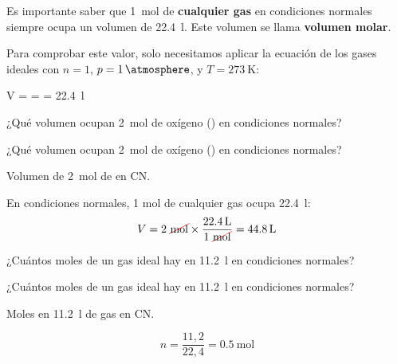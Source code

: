 Es importante saber que \qty{1}{\mol} de \textbf{cualquier gas} en condiciones normales siempre ocupa un volumen de \qty{22.4}{\litre}. Este volumen se llama \textbf{volumen molar}.

Para comprobar este valor, solo necesitamos aplicar la ecuación de los gases ideales con \( n=1 \), \( p = \qty{1}{\atmosphere} \), y \( T = \qty{273}{\kelvin} \):
\begin{centeredequation}
    V =  =  = \qty{22.4}{\litre}
\end{centeredequation}
\begin{exercise}
    ¿Qué volumen ocupan \qty{2}{\mole} de oxígeno () en condiciones normales?
    \begin{solu}
        ¿Qué volumen ocupan \qty{2}{\mole} de oxígeno () en condiciones normales?

        Volumen de \qty{2}{\mole} de  en CN.

        En condiciones normales, 1 mol de cualquier gas ocupa \qty{22.4}{\litre}:
        \begin{equation*}
            V = 2\ \cancelred{\unit{\mole}} \times \dfrac{\qty{22.4}{\litre}}{1\ \cancelred{\unit{\mole}}} = \qty{44.8}{\litre}
        \end{equation*}
    \end{solu}
\end{exercise}
\begin{exercise}
    ¿Cuántos moles de un gas ideal hay en \qty{11.2}{\litre} en condiciones normales?
    \begin{solu}
        ¿Cuántos moles de un gas ideal hay en \qty{11.2}{\litre} en condiciones normales?

        Moles en \qty{11.2}{\litre} de gas en CN.

        \begin{equation*}
            n = \dfrac{11{,}2}{22{,}4} = \qty{0.5}{\mole}
        \end{equation*}
    \end{solu}
\end{exercise}
